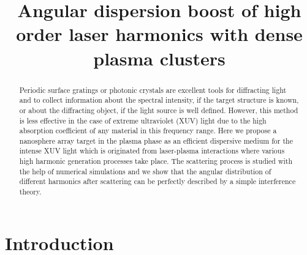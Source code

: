 \documentclass[conference]{IEEEtran}
\begin{document}
\renewcommand*{\figureautorefname}{Fig.}
\renewcommand*{\equationautorefname}{Eq.}






\title{Angular dispersion boost of high order laser harmonics with dense
plasma clusters}

\author{
}


\maketitle

\begin{abstract}
	Periodic surface gratings or photonic crystals are excellent tools for diffracting light and to collect
	information about the spectral intensity, if the target structure is known, or about the diffracting
	object, if the light source is well defined. However, this method is less effective in the case of extreme
	ultraviolet (XUV) light due to the high absorption coefficient of any material in this frequency range.
	Here we propose a nanosphere array target in the plasma phase as an efficient dispersive medium for
	the intense XUV light which is originated from laser-plasma interactions where various high harmonic
	generation processes take place. The scattering process is studied with the help of numerical
	simulations and we show that the angular distribution of different harmonics after scattering can be
	perfectly described by a simple interference theory.
\end{abstract}


\section{Introduction}
\end{document}
